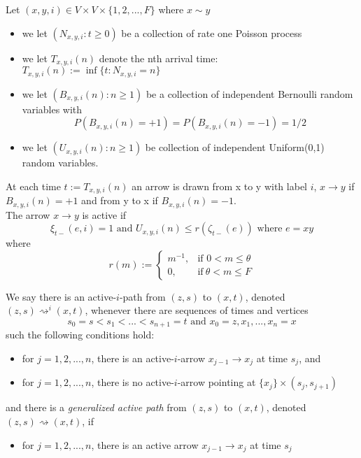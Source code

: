 \documentclass[
paper=128mm:96mm, %
fontsize=11pt, %
pagesize, %
parskip=half-, %
]{scrartcl} %
\theoremstyle{mythmstyle} %
\begin{document}
Let $(x,y,i)\in V  \times V \times \{1,2,...,F\}$ where $x \sim y$
\begin{itemize}
\item we let $(N_{x,y,i}:t \geq 0)$ be a collection of rate one Poisson process
\item we let $T_{x,y,i}(n)$ denote the nth arrival time: $T_{x,y,i}(n):= \inf\{t:N_{x,y,i}=n\}$
\item we let $(B_{x,y,i}(n):n \geq 1)$ be a collection of independent Bernoulli random variables with
\begin{equation}
P(B_{x,y,i}(n)=+1)=P(B_{x,y,i}(n)=-1)=1/2
\end{equation}
\item we let $(U_{x,y,i}(n): n \geq 1)$ be collection of independent Uniform(0,1) random variables.
\end{itemize}
At each time $t:=T_{x,y,i}(n)$ an arrow is drawn from x to y with label $i$, $x\longrightarrow y$ if $B_{x,y,i}(n)=+1$ and from y to x if $B_{x,y,i}(n)=-1$. \\

The arrow $x\longrightarrow y$ is active if
\begin{equation}
\xi_{t-}(e,i)= 1 \text{ and } U_{x,y,i}(n) \leq r(\zeta_{t-}(e)) \text{ where } e=xy
\end{equation}
where 
$$ r(m) := \left\{\begin{array}{cl} m^{-1}, & \mbox{if } 0<m \leq \theta\\ 0, & \mbox{if}\ \theta < m \leq F \end{array}\right.$$

\clearpage

We say there is an active-$i$-path from $(z,s)$ to $(x,t)$, denoted $(z,s) \rightsquigarrow^{i} (x,t)$, whenever there are sequences of times and vertices
$$ s_0 =s<s_1<...<s_{n+1}=t \text{ and } x_0=z, x_1, ...,x_n=x$$
such the following conditions hold:
\begin{itemize}
\item for $j= 1,2,...,n$, there is an active-$i$-arrow $x_{j-1} \longrightarrow x_j$ at time $s_j$, and 
\item for $j= 1,2,...,n$, there is no active-$i$-arrow pointing at $\{x_j\} \times (s_j, s_{j+1})$
\end{itemize}
and there is a \textit{generalized active path} from $(z,s)$ to $(x,t)$, denoted $(z,s) \rightsquigarrow (x,t)$, if 
\begin{itemize}
\item for $j=1,2,...,n$, there is an active arrow $x_{j-1} \longrightarrow x_j$ at time $s_j$
\end{itemize}
\clearpage 
\end{document}
